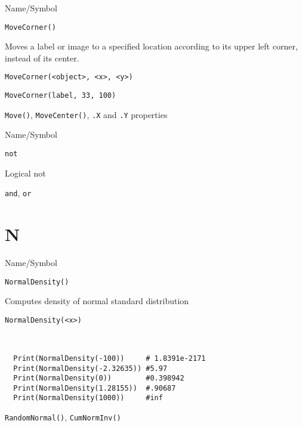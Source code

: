 \begin{desc}{Name/Symbol}
\item[Name/Symbol]	\verb+MoveCorner()+

\item[Description]	Moves a label or image to a specified location
		according to its upper left corner, instead of its center. 

\item[Usage]
\begin{verbatim}
MoveCorner(<object>, <x>, <y>)
\end{verbatim}

\item[Example]	
\begin{verbatim}
MoveCorner(label, 33, 100)
\end{verbatim}

\item[See Also]	\verb+Move()+, \verb+MoveCenter()+, \verb+.X+ and \verb+.Y+ properties
\end{desc}

\rl






\begin{desc}{Name/Symbol}
\item[Name/Symbol]	\verb+not+

\item[Description]	Logical not

\item[Usage]		

\item[Example]	

\item[See Also]	\verb+and+, \verb+or+
\end{desc}

\rl
\section{N}
\rl

\begin{desc}{Name/Symbol}
\item[Name/Symbol]	\verb+NormalDensity()+

\item[Description]	Computes density of normal standard distribution
\item[Usage]
\begin{verbatim}
NormalDensity(<x>)
\end{verbatim}

\item[Example]	
\begin{verbatim}


  Print(NormalDensity(-100))     # 1.8391e-2171
  Print(NormalDensity(-2.32635)) #5.97
  Print(NormalDensity(0))        #0.398942
  Print(NormalDensity(1.28155))  #.90687
  Print(NormalDensity(1000))     #inf

\end{verbatim}

\item[See Also]	\verb+RandomNormal()+, \verb+CumNormInv()+ 
\end{desc}

